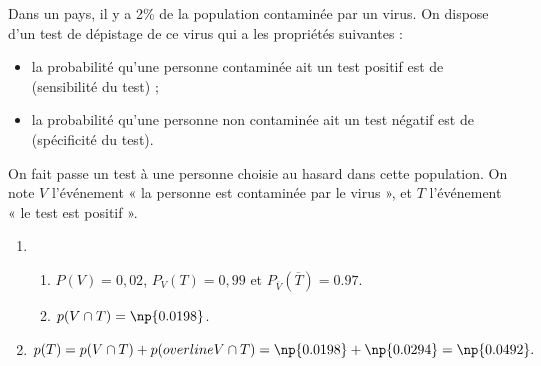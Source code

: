\documentclass[a4paper,12pt,french]{article}
\begin{document}
\begin{Answer}[number=2]
  Dans un pays, il y a 2\% de la population contaminée par un virus. On
  dispose d'un test de dépistage de ce virus qui a les propriétés
  suivantes :
  \begin{itemize}[label=--]
    \item la probabilité qu'une personne contaminée ait un test positif
      est de  (sensibilité du test) ;
    \item la probabilité qu'une personne non contaminée ait un test
      négatif est de  (spécificité du test).
  \end{itemize}
  On fait passe un test à une personne choisie au hasard dans cette
  population. On note $V$ l'événement « la personne est contaminée par
  le virus », et  $T$ l'événement « le test est positif  ».

  \begin{enumerate}
    \item \begin{enumerate}
        \item $P(V) = 0,02$, $P_V(T) = 0,99$ et
          $P_{\overline{V}}(\overline{T}) = 0.97$.

          \begin{center}
          \end{center}
        \item $p(V\cap T) = \np{0.0198}$.
      \end{enumerate}
    \item $p(T) = p(V\cap T) + p(overline{V} \cap T) = \np{0.0198} +
      \np{0.0294} = \np{0.0492}.$
  \end{enumerate}
\end{Answer}
\end{document}
